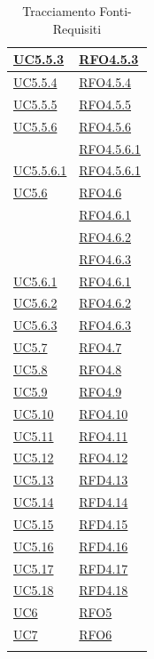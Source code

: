 \begin{longtable}{|>{\centering}m{5cm}|m{5cm}<{\centering}|}
\hyperref[UC5.5.3]{UC5.5.3} & \hyperlink{RFO4.5.3}{RFO4.5.3}\\ \hline
\hyperref[UC5.5.4]{UC5.5.4} & \hyperlink{RFO4.5.4}{RFO4.5.4}\\ \hline
\hyperref[UC5.5.5]{UC5.5.5} & \hyperlink{RFO4.5.5}{RFO4.5.5}\\ \hline
\hyperref[UC5.5.6]{UC5.5.6} & \hyperlink{RFO4.5.6}{RFO4.5.6}\\
& \hyperlink{RFO4.5.6.1}{RFO4.5.6.1}\\ \hline
\hyperref[UC5.5.6.1]{UC5.5.6.1} & \hyperlink{RFO4.5.6.1}{RFO4.5.6.1}\\ \hline
\hyperref[UC5.6]{UC5.6} & \hyperlink{RFO4.6}{RFO4.6}\\
& \hyperlink{RFO4.6.1}{RFO4.6.1}\\
& \hyperlink{RFO4.6.2}{RFO4.6.2}\\
& \hyperlink{RFO4.6.3}{RFO4.6.3}\\ \hline
\hyperref[UC5.6.1]{UC5.6.1} & \hyperlink{RFO4.6.1}{RFO4.6.1}\\ \hline
\hyperref[UC5.6.2]{UC5.6.2} & \hyperlink{RFO4.6.2}{RFO4.6.2}\\ \hline
\hyperref[UC5.6.3]{UC5.6.3} & \hyperlink{RFO4.6.3}{RFO4.6.3}\\ \hline
\hyperref[UC5.7]{UC5.7} & \hyperlink{RFO4.7}{RFO4.7}\\ \hline
\hyperref[UC5.8]{UC5.8} & \hyperlink{RFO4.8}{RFO4.8}\\ \hline
\hyperref[UC5.9]{UC5.9} & \hyperlink{RFO4.9}{RFO4.9}\\ \hline
\hyperref[UC5.10]{UC5.10} & \hyperlink{RFO4.10}{RFO4.10}\\ \hline
\hyperref[UC5.11]{UC5.11} & \hyperlink{RFO4.11}{RFO4.11}\\ \hline
\hyperref[UC5.12]{UC5.12} & \hyperlink{RFO4.12}{RFO4.12}\\ \hline
\hyperref[UC5.13]{UC5.13} & \hyperlink{RFD4.13}{RFD4.13}\\ \hline
\hyperref[UC5.14]{UC5.14} & \hyperlink{RFD4.14}{RFD4.14}\\ \hline
\hyperref[UC5.15]{UC5.15} & \hyperlink{RFD4.15}{RFD4.15}\\ \hline
\hyperref[UC5.16]{UC5.16} & \hyperlink{RFD4.16}{RFD4.16}\\ \hline
\hyperref[UC5.17]{UC5.17} & \hyperlink{RFD4.17}{RFD4.17}\\ \hline
\hyperref[UC5.18]{UC5.18} & \hyperlink{RFD4.18}{RFD4.18}\\ \hline
\hyperref[UC6]{UC6} & \hyperlink{RFO5}{RFO5}\\ \hline
\hyperref[UC7]{UC7} & \hyperlink{RFO6}{RFO6}\\ \hline
\caption[Tracciamento Fonti-Requisiti]{Tracciamento Fonti-Requisiti}
\label{tabella:fonti-requi}
\end{longtable}
\clearpage

